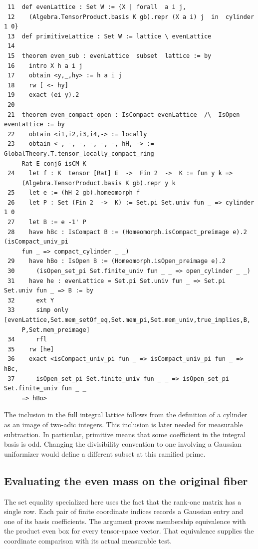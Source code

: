 \documentclass[12pt,letterpaper]{article}
\begin{document}
{\fontsize{9.2}{11.2}\selectfont\begin{verbatim}
 11  def evenLattice : Set W := {X | forall  a i j,
 12    (Algebra.TensorProduct.basis K gb).repr (X a i) j  in  cylinder 1 0}
 13  def primitiveLattice : Set W := lattice \ evenLattice
 14
 15  theorem even_sub : evenLattice  subset  lattice := by
 16    intro X h a i j
 17    obtain <y,_,hy> := h a i j
 18    rw [ <- hy]
 19    exact (ei y).2
 20
 21  theorem even_compact_open : IsCompact evenLattice  /\  IsOpen evenLattice := by
 22    obtain <i1,i2,i3,i4,-> := locally
 23    obtain <-, -, -, -, -, -, hH, -> := GlobalTheory.T.tensor_locally_compact_ring
     Rat E conjG isCM K
 24    let f : K  tensor [Rat] E  ->  Fin 2  ->  K := fun y k =>
     (Algebra.TensorProduct.basis K gb).repr y k
 25    let e := (hH 2 gb).homeomorph f
 26    let P : Set (Fin 2  ->  K) := Set.pi Set.univ fun _ => cylinder 1 0
 27    let B := e -1' P
 28    have hBc : IsCompact B := (Homeomorph.isCompact_preimage e).2 (isCompact_univ_pi
     fun _ => compact_cylinder _ _)
 29    have hBo : IsOpen B := (Homeomorph.isOpen_preimage e).2
 30      (isOpen_set_pi Set.finite_univ fun _ _ => open_cylinder _ _)
 31    have he : evenLattice = Set.pi Set.univ fun _ => Set.pi Set.univ fun _ => B := by
 32      ext Y
 33      simp only [evenLattice,Set.mem_setOf_eq,Set.mem_pi,Set.mem_univ,true_implies,B,
     P,Set.mem_preimage]
 34      rfl
 35    rw [he]
 36    exact <isCompact_univ_pi fun _ => isCompact_univ_pi fun _ => hBc,
 37      isOpen_set_pi Set.finite_univ fun _ _ => isOpen_set_pi Set.finite_univ fun _ _
     => hBo>
\end{verbatim}}
The inclusion in the full integral lattice follows from the definition of a cylinder as an image of two-adic integers. This inclusion is later needed for measurable subtraction. In particular, primitive means that some coefficient in the integral basis is odd. Changing the divisibility convention to one involving a Gaussian uniformizer would define a different subset at this ramified prime.
\clearpage{}\subsection*{Evaluating the even mass on the original fiber}\label{extract-FourEndpoint83}
The set equality specialized here uses the fact that the rank-one matrix has a single row. Each pair of finite coordinate indices records a Gaussian entry and one of its basis coefficients. The argument proves membership equivalence with the product even box for every tensor-space vector. That equivalence supplies the coordinate comparison with its actual measurable test.
\end{document}
